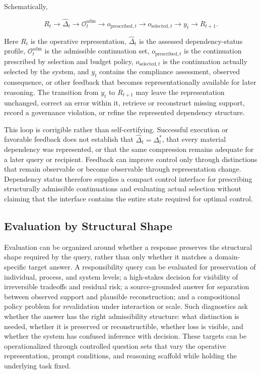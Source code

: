 \documentclass[11pt]{article}
\theoremstyle{definition}
\theoremstyle{remark}
\begin{document}
Schematically,

\[
R_t
\longrightarrow
\widehat{\Delta}_t
\longrightarrow
\mathcal O^{\mathrm{adm}}_t
\longrightarrow
o_{\mathrm{prescribed},t}
\longrightarrow
o_{\mathrm{selected},t}
\longrightarrow
y_t
\longrightarrow
R_{t+1}.
\]

Here \(R_t\) is the operative representation, \(\widehat{\Delta}_t\) is the assessed dependency-status profile, \(\mathcal O^{\mathrm{adm}}_t\) is the admissible continuation set, \(o_{\mathrm{prescribed},t}\) is the continuation prescribed by selection and budget policy, \(o_{\mathrm{selected},t}\) is the continuation actually selected by the system, and \(y_t\) contains the compliance assessment, observed consequence, or other feedback that becomes representationally available for later reasoning. The transition from \(y_t\) to \(R_{t+1}\) may leave the representation unchanged, correct an error within it, retrieve or reconstruct missing support, record a governance violation, or refine the represented dependency structure.

This loop is corrigible rather than self-certifying. Successful execution or favorable feedback does not establish that \(\widehat{\Delta}_t=\Delta_t^{*}\), that every material dependency was represented, or that the same compression remains adequate for a later query or recipient. Feedback can improve control only through distinctions that remain observable or become observable through representation change. Dependency status therefore supplies a compact control interface for prescribing structurally admissible continuations and evaluating actual selection without claiming that the interface contains the entire state required for optimal control.

\subsection{Evaluation by Structural Shape}

Evaluation can be organized around whether a response preserves the structural shape required by the query, rather than only whether it matches a domain-specific target answer. A responsibility query can be evaluated for preservation of individual, process, and system levels; a high-stakes decision for visibility of irreversible tradeoffs and residual risk; a source-grounded answer for separation between observed support and plausible reconstruction; and a compositional policy problem for revalidation under interaction or scale. Such diagnostics ask whether the answer has the right admissibility structure: what distinction is needed, whether it is preserved or reconstructible, whether loss is visible, and whether the system has confused inference with decision. These targets can be operationalized through controlled question sets that vary the operative representation, prompt conditions, and reasoning scaffold while holding the underlying task fixed.
\end{document}
